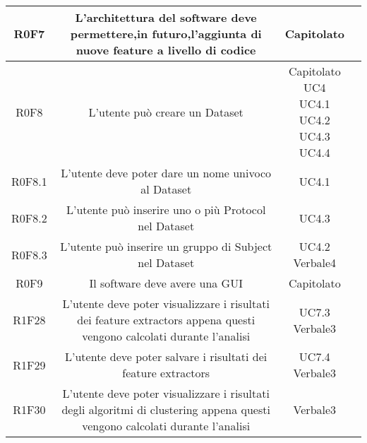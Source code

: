 \begin{center}
\begin{longtable}{|c|c|c|c|}
\hline
R0F7   & \parbox[t]{\larghezza}{L'architettura del software deve permettere,in futuro,l'aggiunta di nuove feature\glossario{} a livello di codice}  & \parbox[t]{\dimFonti}{ Capitolato \\} \\
\hline
R0F8   & \parbox[t]{\larghezza}{L'utente può creare un Dataset\glossario{}}  & \parbox[t]{\dimFonti}{ Capitolato \\ UC4 \\ UC4.1 \\ UC4.2 \\ UC4.3 \\ UC4.4 \\} \\
\hline
R0F8.1   & \parbox[t]{\larghezza}{L'utente deve poter dare un nome univoco al Dataset\glossario{}}  & \parbox[t]{\dimFonti}{ UC4.1 \\} \\
\hline
R0F8.2   & \parbox[t]{\larghezza}{L'utente può inserire uno o più Protocol\glossario{} nel Dataset\glossario{}}  & \parbox[t]{\dimFonti}{ UC4.3 \\} \\
\hline
R0F8.3   & \parbox[t]{\larghezza}{L'utente può inserire un gruppo di Subject\glossario{} nel Dataset\glossario{} }  & \parbox[t]{\dimFonti}{ UC4.2 \\ Verbale4 \\} \\
\hline
R0F9   & \parbox[t]{\larghezza}{Il software deve avere una GUI\glossario{}}  & \parbox[t]{\dimFonti}{ Capitolato \\} \\
\hline
R1F28   & \parbox[t]{\larghezza}{L'utente deve poter visualizzare i risultati dei feature extractors\glossario{} appena questi vengono calcolati durante l'analisi}  & \parbox[t]{\dimFonti}{ UC7.3 \\ Verbale3 \\} \\
\hline
R1F29   & \parbox[t]{\larghezza}{L'utente deve poter salvare i risultati dei feature extractors\glossario{} }  & \parbox[t]{\dimFonti}{ UC7.4 \\ Verbale3 \\} \\
\hline
R1F30   & \parbox[t]{\larghezza}{L'utente deve poter visualizzare i risultati degli algoritmi di clustering\glossario{} appena questi vengono calcolati durante l'analisi
}  & \parbox[t]{\dimFonti}{ Verbale3 \\} \\

\end{longtable}
\end{center}

